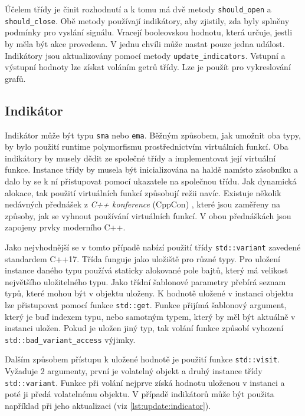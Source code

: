 Účelem třídy je činit rozhodnutí a k tomu má dvě metody \texttt{should\_open} a \texttt{should\_close}.
Obě metody používají indikátory, aby zjistily, zda byly splněny podmínky pro vyslání signálu.
Vracejí booleovskou hodnotu, která určuje, jestli by měla být akce provedena.
V jednu chvíli může nastat pouze jedna událost.
Indikátory jsou aktualizovány pomocí metody \texttt{update\_indicators}.
Vstupní a výstupní hodnoty lze získat voláním getrů třídy.
Lze je použít pro vykreslování grafů.

\subsection{Indikátor}
Indikátor může být typu \texttt{sma} nebo \texttt{ema}.
Běžným způsobem, jak umožnit oba typy, by bylo použití runtime polymorfismu prostřednictvím virtuálních funkcí.
Oba indikátory by musely dědit ze společné třídy a implementovat její virtuální funkce.
Instance třídy by musela být inicializována na haldě namísto zásobníku a dalo by se k ní přistupovat pomocí ukazatele na společnou třídu.
Jak dynamická alokace, tak použití virtuálních funkcí způsobují režii navíc.
Existuje několik nedávných přednášek z \textit{C++ konference} (CppCon) \cite{gobel-virtual, bogosavljevic-virtual}, které jsou zaměřeny na způsoby, jak se vyhnout používání virtuálních funkcí.
V obou přednáškách jsou zapojeny prvky moderního C++.

Jako nejvhodnější se v tomto případě nabízí použití třídy \texttt{std::variant} zavedené standardem C++17.
Třída funguje jako uložiště pro různé typy.
Pro uložení instance daného typu používá staticky alokované pole bajtů, který má velikost největšího uložitelného typu.
Jako třídní šablonové parametry přebírá seznam typů, které mohou být v objektu uloženy.
K hodnotě uložené v instanci objektu lze přistupovat pomocí funkce \texttt{std::get}.
Funkce přijímá šablonový argument, který je buď indexem typu, nebo samotným typem, který by měl být aktuálně v instanci uložen.
Pokud je uložen jiný typ, tak volání funkce způsobí vyhození \texttt{std::bad\_variant\_access} výjimky.

Dalším způsobem přístupu k uložené hodnotě je použití funkce \texttt{std::visit}.
Vyžaduje 2 argumenty, první je volatelný objekt a druhý instance třídy \texttt{std::variant}.
Funkce při volání nejprve získá hodnotu uloženou v instanci a poté ji předá volatelnému objektu.
V případě indikátorů může být použita například při jeho aktualizaci (viz \ref{lst:update:indicator}).

